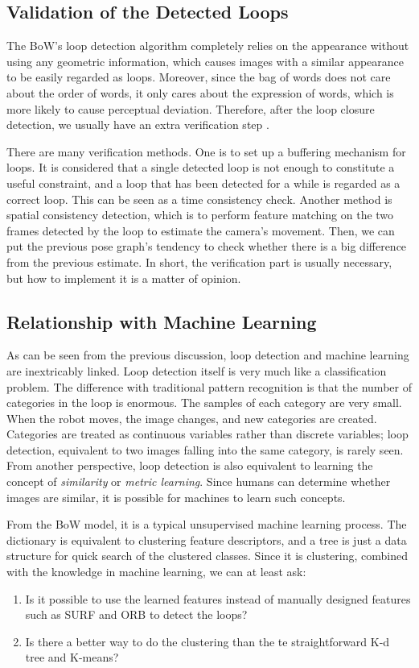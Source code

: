 \subsection{Validation of the Detected Loops}
The BoW's loop detection algorithm completely relies on the appearance without using any geometric information, which causes images with a similar appearance to be easily regarded as loops. Moreover, since the bag of words does not care about the order of words, it only cares about the expression of words, which is more likely to cause perceptual deviation. Therefore, after the loop closure detection, we usually have an extra verification step {\cite{Latif2013, Cadena2012}}.

There are many verification methods. One is to set up a buffering mechanism for loops. It is considered that a single detected loop is not enough to constitute a useful constraint, and a loop that has been detected for a while is regarded as a correct loop. This can be seen as a time consistency check. Another method is spatial consistency detection, which is to perform feature matching on the two frames detected by the loop to estimate the camera's movement. Then, we can put the previous pose graph's tendency to check whether there is a big difference from the previous estimate. In short, the verification part is usually necessary, but how to implement it is a matter of opinion.

\subsection{Relationship with Machine Learning}
As can be seen from the previous discussion, loop detection and machine learning are inextricably linked. Loop detection itself is very much like a classification problem. The difference with traditional pattern recognition is that the number of categories in the loop is enormous. The samples of each category are very small. When the robot moves, the image changes, and new categories are created. Categories are treated as continuous variables rather than discrete variables; loop detection, equivalent to two images falling into the same category, is rarely seen. From another perspective, loop detection is also equivalent to learning the concept of \textit{similarity} or \textit{metric learning}. Since humans can determine whether images are similar, it is possible for machines to learn such concepts.

From the BoW model, it is a typical unsupervised machine learning process. The dictionary is equivalent to clustering feature descriptors, and a tree is just a data structure for quick search of the clustered classes. Since it is clustering, combined with the knowledge in machine learning, we can at least ask:
\begin{enumerate}
	\item Is it possible to use the learned features instead of manually designed features such as SURF and ORB to detect the loops?
	\item Is there a better way to do the clustering than the te straightforward K-d tree and K-means?
\end{enumerate}

